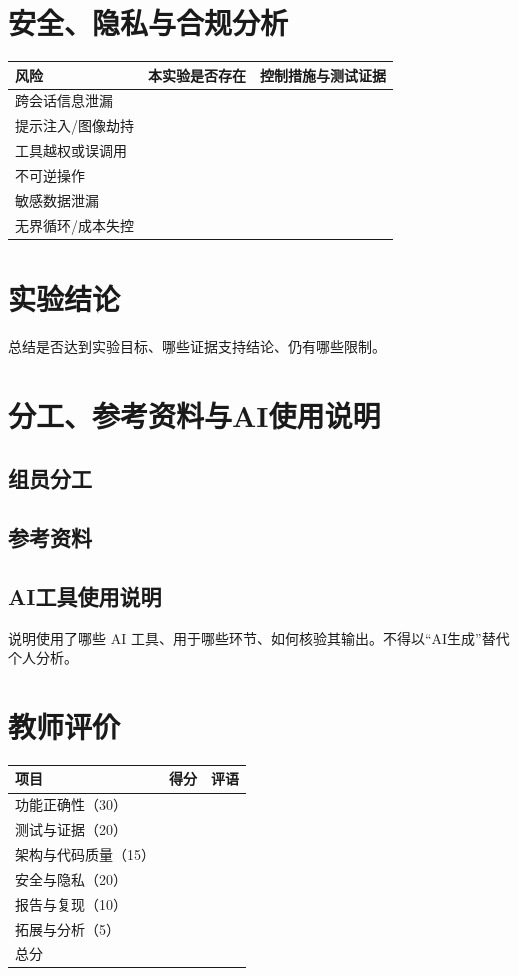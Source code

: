 \documentclass[UTF8,zihao=-4]{ctexart}
\begin{document}
\section{安全、隐私与合规分析}

\begin{tabularx}{\textwidth}{L{3.5cm} Y Y}
\toprule
风险 & 本实验是否存在 & 控制措施与测试证据\\
\midrule
跨会话信息泄漏 & &\\[1.1cm]
提示注入/图像劫持 & &\\[1.1cm]
工具越权或误调用 & &\\[1.1cm]
不可逆操作 & &\\[1.1cm]
敏感数据泄漏 & &\\[1.1cm]
无界循环/成本失控 & &\\[1.1cm]
\bottomrule
\end{tabularx}

\section{实验结论}

总结是否达到实验目标、哪些证据支持结论、仍有哪些限制。

\vspace{5cm}

\section{分工、参考资料与AI使用说明}

\subsection{组员分工}

\vspace{2.5cm}

\subsection{参考资料}

\vspace{2.5cm}

\subsection{AI工具使用说明}

说明使用了哪些 AI 工具、用于哪些环节、如何核验其输出。不得以“AI生成”替代个人分析。

\vspace{3cm}

\section*{教师评价}

\begin{tabularx}{\textwidth}{L{3.5cm} C{2.2cm} Y}
\toprule
项目 & 得分 & 评语\\
\midrule
功能正确性（30） & &\\[0.8cm]
测试与证据（20） & &\\[0.8cm]
架构与代码质量（15） & &\\[0.8cm]
安全与隐私（20） & &\\[0.8cm]
报告与复现（10） & &\\[0.8cm]
拓展与分析（5） & &\\[0.8cm]
\midrule
总分 & &\\[0.8cm]
\bottomrule
\end{tabularx}
\end{document}
